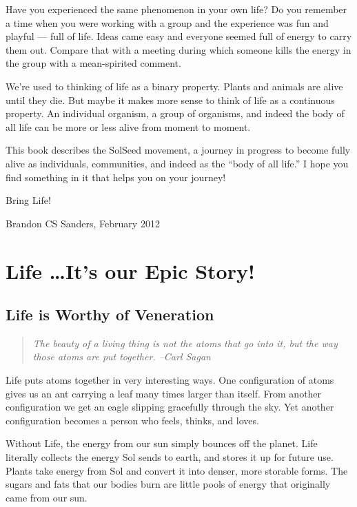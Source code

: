 \documentclass[ebook,11pt,openany,twoside]{memoir}
\newcommand{\imagefacingchapter}[1]{
  \cleartoverso
  \clearpage \null
  \thispagestyle{cleared}
  \AddToShipoutPictureBG*{%
    \AtStockLowerLeft{%
      \texttt{[image: \#1]}
    }
  }
  \clearpage
}
\begin{document}
Have you experienced the same phenomenon in your own life? Do you remember a
time when you were working with a group and the experience was fun and playful
--- full of life. Ideas came easy and everyone seemed full of energy to carry
them out. Compare that with a meeting during which someone kills the energy in
the group with a mean-spirited comment.

We're used to thinking of life as a binary property. Plants and animals are
alive until they die. But maybe it makes more sense to think of life as a
continuous property. An individual organism, a group of organisms, and indeed
the body of all life can be more or less alive from moment to moment.

This book describes the SolSeed movement, a journey in progress to become fully
alive as individuals, communities, and indeed as the ``body of all life.'' I
hope you find something in it that helps you on your journey!

Bring Life!

Brandon CS Sanders, February 2012

\clearpage \null
\thispagestyle{cleared}

\cleartorecto
\thispagestyle{cleared}
\part{Life \ldots It's our Epic Story!}

\imagefacingchapter{images/LifeIsWorthyOfVeneration}
\pagestyle{plain}
\chapter{Life is Worthy of Veneration}


\begin{quote}
{\em The beauty of a living thing is not the atoms that go into it, but the way
those atoms are put together. --Carl Sagan}
\end{quote}

Life puts atoms together in very interesting ways. One configuration of atoms
gives us an ant carrying a leaf many times larger than itself. From another
configuration we get an eagle slipping gracefully through the sky. Yet another
configuration becomes a person who feels, thinks, and loves.

Without Life, the energy from our sun simply bounces off the planet. Life
literally collects the energy Sol sends to earth, and stores it up for future
use. Plants take energy from Sol and convert it into denser, more storable
forms. The sugars and fats that our bodies burn are little pools of energy that
originally came from our sun.
\end{document}

